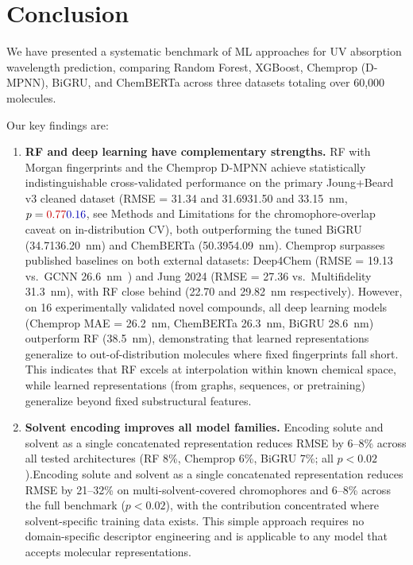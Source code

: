 \documentclass[journal=jcisd8,manuscript=article]{achemso}
\newcommand{\added}[1]{{\color{addedblue}#1}}
\newcommand{\removed}[1]{{\color{removedred}#1}}
\begin{document}
\FloatBarrier

\section{Conclusion}
\label{sec:conclusion}

We have presented a systematic benchmark of ML approaches for UV absorption wavelength prediction, comparing Random Forest, XGBoost, Chemprop (D-MPNN), BiGRU, and ChemBERTa across three datasets totaling over 60,000 molecules.

Our key findings are:

\begin{enumerate}
 \item \textbf{RF and deep learning have complementary strengths.}
 RF with Morgan fingerprints and the Chemprop D-MPNN achieve statistically indistinguishable cross-validated performance on the primary Joung+Beard \added{v3 cleaned }dataset (RMSE = \removed{31.34 and 31.69}\added{31.50 and 33.15}~nm, $p = \removed{0.77}\added{0.16}$\added{, see Methods and Limitations for the chromophore-overlap caveat on in-distribution CV}), both outperforming the tuned BiGRU (\removed{34.71}\added{36.20}~nm) and ChemBERTa (\removed{50.39}\added{54.09}~nm). Chemprop surpasses published baselines on both external datasets: Deep4Chem (RMSE = 19.13 vs.\ GCNN 26.6~nm~\cite{joung2021deep}) and Jung 2024 (RMSE = 27.36 vs.\ Multifidelity 31.3~nm), with RF close behind (22.70 and 29.82~nm respectively).
 However, on 16 experimentally validated novel compounds, all deep learning models (Chemprop MAE = 26.2~nm, ChemBERTa 26.3~nm, BiGRU 28.6~nm) outperform RF (38.5~nm), demonstrating that learned representations generalize to out-of-distribution molecules where fixed fingerprints fall short.
 This indicates that RF excels at interpolation within known chemical space, while learned representations (from graphs, sequences, or pretraining) generalize beyond fixed substructural features.

 \item \textbf{Solvent encoding improves all model families.}
 \removed{Encoding solute and solvent as a single concatenated representation reduces RMSE by 6--8\% across all tested architectures (RF 8\%, Chemprop 6\%, BiGRU 7\%; all $p < 0.02$).}\added{Encoding solute and solvent as a single concatenated representation reduces RMSE by 21--32\% on multi-solvent-covered chromophores and 6--8\% across the full benchmark ($p < 0.02$), with the contribution concentrated where solvent-specific training data exists.}
 This simple approach requires no domain-specific descriptor engineering and is applicable to any model that accepts molecular representations.


\end{enumerate}
\end{document}

